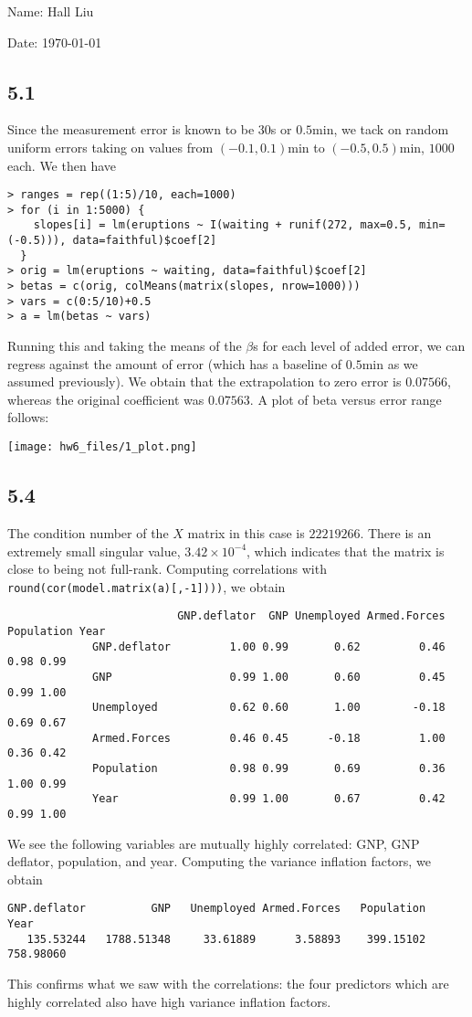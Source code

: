 \documentclass{article}
\begin{document}
Name: Hall Liu

Date: \today 
\vspace{1.5cm}

\subsection*{5.1}
Since the measurement error is known to be $30$s or $0.5$min, we tack on random uniform errors taking on values from $(-0.1,0.1)$min to $(-0.5,0.5)$min, $1000$ each. We then have
\begin{verbatim}
> ranges = rep((1:5)/10, each=1000)
> for (i in 1:5000) {
    slopes[i] = lm(eruptions ~ I(waiting + runif(272, max=0.5, min=(-0.5))), data=faithful)$coef[2] 
  }
> orig = lm(eruptions ~ waiting, data=faithful)$coef[2]
> betas = c(orig, colMeans(matrix(slopes, nrow=1000)))
> vars = c(0:5/10)+0.5
> a = lm(betas ~ vars)
\end{verbatim}
Running this and taking the means of the $\beta$s for each level of added error, we can regress against the amount of error (which has a baseline of $0.5$min as we assumed previously). We obtain that the extrapolation to zero error is $0.07566$, whereas the original coefficient was $0.07563$. A plot of beta versus error range follows: 

\texttt{[image: hw6\_files/1\_plot.png]}
\subsection*{5.4}
The condition number of the $X$ matrix in this case is $22219266$. There is an extremely small singular value, $3.42\times10^{-4}$, which indicates that the matrix is close to being not full-rank.
Computing correlations with \verb|round(cor(model.matrix(a)[,-1])))|, we obtain
\begin{verbatim}
                          GNP.deflator  GNP Unemployed Armed.Forces Population Year
             GNP.deflator         1.00 0.99       0.62         0.46       0.98 0.99
             GNP                  0.99 1.00       0.60         0.45       0.99 1.00
             Unemployed           0.62 0.60       1.00        -0.18       0.69 0.67
             Armed.Forces         0.46 0.45      -0.18         1.00       0.36 0.42
             Population           0.98 0.99       0.69         0.36       1.00 0.99
             Year                 0.99 1.00       0.67         0.42       0.99 1.00
\end{verbatim}             
We see the following variables are mutually highly correlated: GNP, GNP deflator, population, and year.
Computing the variance inflation factors, we obtain
\begin{verbatim}
GNP.deflator          GNP   Unemployed Armed.Forces   Population         Year 
   135.53244   1788.51348     33.61889      3.58893    399.15102    758.98060 
\end{verbatim}
This confirms what we saw with the correlations: the four predictors which are highly correlated also have high variance inflation factors.
\end{document}
